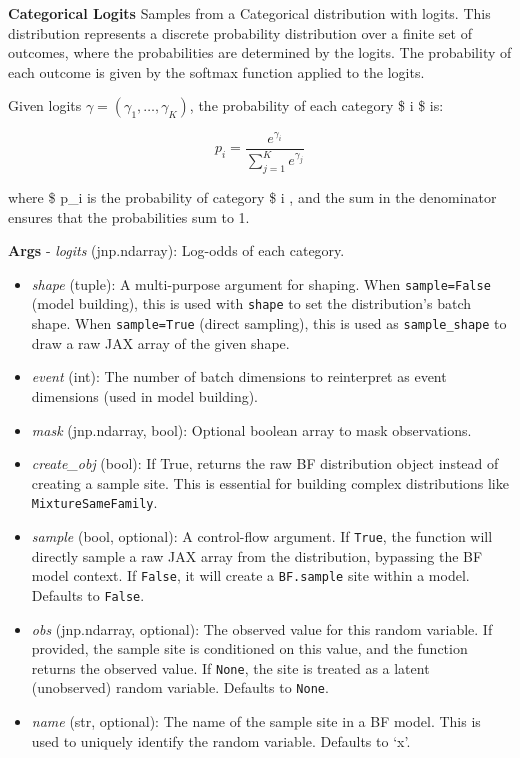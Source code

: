 \documentclass[
  letterpaper,
  DIV=11,
  numbers=noendperiod]{scrartcl}
\begin{document}
\textbf{Categorical Logits} Samples from a Categorical distribution with
logits. This distribution represents a discrete probability distribution
over a finite set of outcomes, where the probabilities are determined by
the logits. The probability of each outcome is given by the softmax
function applied to the logits.

Given logits \(\gamma = (\gamma_1, \dots, \gamma_K)\), the probability
of each category \$ i \$ is:

\[
p_i = \frac{e^{\gamma_i}}{\sum_{j=1}^{K} e^{\gamma_j}}
\]

where \$ p\_i is the probability of category \$ i , and the sum in the
denominator ensures that the probabilities sum to 1.

\textbf{Args} - \emph{logits} (jnp.ndarray): Log-odds of each category.

\begin{itemize}
\item
  \emph{shape} (tuple): A multi-purpose argument for shaping. When
  \texttt{sample=False} (model building), this is used with
  \texttt{shape} to set the distribution's batch shape. When
  \texttt{sample=True} (direct sampling), this is used as
  \texttt{sample\_shape} to draw a raw JAX array of the given shape.
\item
  \emph{event} (int): The number of batch dimensions to reinterpret as
  event dimensions (used in model building).
\item
  \emph{mask} (jnp.ndarray, bool): Optional boolean array to mask
  observations.
\item
  \emph{create\_obj} (bool): If True, returns the raw BF distribution
  object instead of creating a sample site. This is essential for
  building complex distributions like \texttt{MixtureSameFamily}.
\item
  \emph{sample} (bool, optional): A control-flow argument. If
  \texttt{True}, the function will directly sample a raw JAX array from
  the distribution, bypassing the BF model context. If \texttt{False},
  it will create a \texttt{BF.sample} site within a model. Defaults to
  \texttt{False}.
\item
  \emph{obs} (jnp.ndarray, optional): The observed value for this random
  variable. If provided, the sample site is conditioned on this value,
  and the function returns the observed value. If \texttt{None}, the
  site is treated as a latent (unobserved) random variable. Defaults to
  \texttt{None}.
\item
  \emph{name} (str, optional): The name of the sample site in a BF
  model. This is used to uniquely identify the random variable. Defaults
  to `x'.
\end{itemize}
\end{document}
